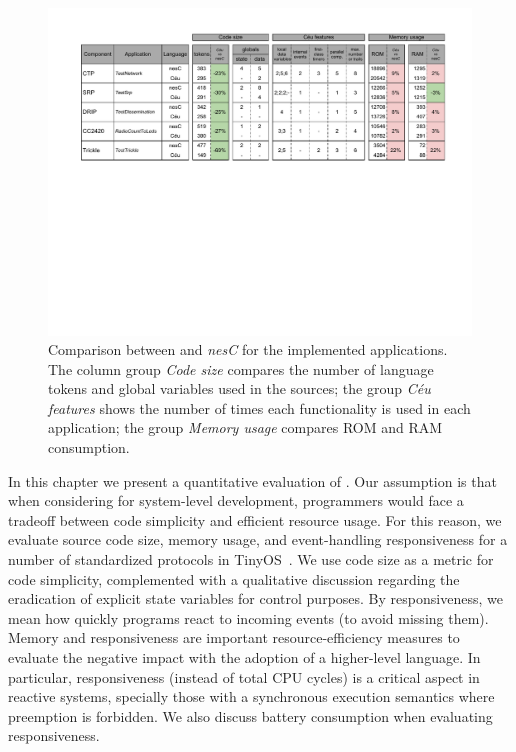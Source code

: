 %

\begin{figure}[t]
\includegraphics[width=\textwidth,clip=true,trim=55px 320px 45px 0px]{eval}
\caption{ Comparison between \CEU and \emph{nesC} for the implemented 
applications. \newline
{\small %
The column group \emph{Code size} compares the number of language tokens and 
global variables used in the sources;
the group \emph{C\'eu features} shows the number of times each functionality is 
used in each application;
the group \emph{Memory usage} compares ROM and RAM consumption.
}%
\label{fig.eval}
}
\end{figure}

In this chapter we present a quantitative evaluation of \CEU.
%
Our assumption is that when considering \CEU for system-level development, 
programmers would face a tradeoff between code simplicity and efficient 
resource usage.
%
For this reason, we evaluate source code size, memory usage, and event-handling 
responsiveness for a number of standardized protocols in 
TinyOS~\cite{wsn.teps}.
%
We use code size as a metric for code simplicity, complemented with a 
qualitative discussion regarding the eradication of explicit state variables 
for control purposes.
%
By responsiveness, we mean how quickly programs react to incoming events (to 
avoid missing them).
%
Memory and responsiveness are important resource-efficiency measures to 
evaluate the negative impact with the adoption of a higher-level language.
%
In particular, responsiveness (instead of total CPU cycles) is a critical 
aspect in reactive systems, specially those with a synchronous execution 
semantics where preemption is forbidden.
%
We also discuss battery consumption when evaluating responsiveness.

